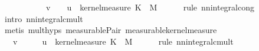 \begin{isabellebody}
\ \ \ \ \ \ \ \ \ {\isasymintegral}\isactrlsup {\isacharplus}{\kern0pt}\ {\isasymomega}\ v\ {\isacharasterisk}{\kern0pt}\ {\isacharparenleft}{\kern0pt}{\isasymintegral}\isactrlsup {\isacharplus}{\kern0pt}\ {\isasymomega}\ u\ {\isacharparenleft}{\kern0pt}{\isasymomega}\ {\isasymomega}kernel{\isacharunderscore}{\kern0pt}measure\ K\ {\isasymomega}\ {\isasympartial}M{\isachardoublequoteclose}\isanewline
\ \ \ \ \isamarkupfalse%
\ {\isacharparenleft}{\kern0pt}rule\ nn{\isacharunderscore}{\kern0pt}integral{\isacharunderscore}{\kern0pt}cong{\isacharparenright}{\kern0pt}\isanewline
\ \ \ \ \isamarkupfalse%
\ {\isacharparenleft}{\kern0pt}intro\ nn{\isacharunderscore}{\kern0pt}integral{\isacharunderscore}{\kern0pt}cmult{\isacharparenright}{\kern0pt}\isanewline
\ \ \ \ \ \isamarkupfalse%
\ {\isacharparenleft}{\kern0pt}metis\ mult{\isachardot}{\kern0pt}hyps{\isacharparenleft}{\kern0pt}{}{\isacharparenright}{\kern0pt}\ measurable{\isacharunderscore}{\kern0pt}Pair{}\ measurable{\isacharunderscore}{\kern0pt}kernel{\isacharunderscore}{\kern0pt}measure{\isacharparenright}{\kern0pt}\isanewline
\ \ \ \ \isamarkupfalse%
\isanewline
\ \ \isamarkupfalse%
\ \isamarkupfalse%
\ {\isachardoublequoteopen}{\isachardot}{\kern0pt}{\isachardot}{\kern0pt}{\isachardot}{\kern0pt}\ {\isacharequal}{\kern0pt}\ v\ {\isacharasterisk}{\kern0pt}\ {\isacharparenleft}{\kern0pt}{\isasymintegral}\isactrlsup {\isacharplus}{\kern0pt}\ {\isasymomega}\ {\isasymintegral}\isactrlsup {\isacharplus}{\kern0pt}\ {\isasymomega}\ u\ {\isacharparenleft}{\kern0pt}{\isasymomega}\ {\isasymomega}kernel{\isacharunderscore}{\kern0pt}measure\ K\ {\isasymomega}\ {\isasympartial}M{\isacharparenright}{\kern0pt}{\isachardoublequoteclose}\isanewline
\ \ \ \ \isamarkupfalse%
\ {\isacharparenleft}{\kern0pt}rule\ nn{\isacharunderscore}{\kern0pt}integral{\isacharunderscore}{\kern0pt}cmult{\isacharparenright}{\kern0pt}\isanewline
\ \ \ \ \isamarkupfalse%

\end{isabellebody}
